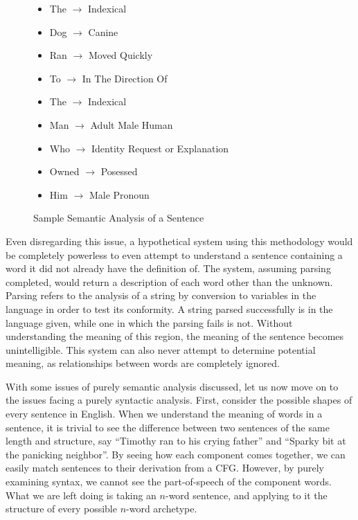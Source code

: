 \begin{center}
\begin{figure}[H]
\begin{center}

\begin{itemize}

	\item The $\rightarrow$ Indexical 
	\item Dog $\rightarrow$ Canine
	\item Ran $\rightarrow$ Moved Quickly
	\item To $\rightarrow$ In The Direction Of
	\item The $\rightarrow$ Indexical
	\item Man $\rightarrow$ Adult Male Human
	\item Who $\rightarrow$ Identity Request or Explanation
	\item Owned $\rightarrow$ Posessed
	\item Him $\rightarrow$ Male Pronoun

\end{itemize}
\end{center}
\caption{Sample Semantic Analysis of a Sentence}
\end{figure}
\end{center}

Even disregarding this issue, a hypothetical system using this methodology would be completely powerless to even attempt to understand a sentence containing a word it did not already have the definition of. The system, assuming parsing completed, would return a description of each word other than the unknown. Parsing refers to the analysis of a string by conversion to variables in the language in order to test its conformity. A string parsed successfully is in the language given, while one in which the parsing fails is not. Without understanding the meaning of this region, the meaning of the sentence becomes unintelligible. This system can also never attempt to determine potential meaning, as relationships between words are completely ignored.

With some issues of purely semantic analysis discussed, let us now move on to the issues facing a purely syntactic analysis. First, consider the possible shapes of every sentence in English. When we understand the meaning of words in a sentence, it is trivial to see the difference between two sentences of the same length and structure, say ``Timothy ran to his crying father'' and ``Sparky bit at the panicking neighbor''. By seeing how each component comes together, we can easily match sentences to their derivation from a CFG. However, by purely examining syntax, we cannot see the part-of-speech of the component words. What we are left doing is taking an $n$-word sentence, and applying to it the structure of every possible $n$-word archetype.

